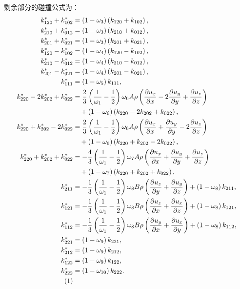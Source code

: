 剩余部分的碰撞公式为：
\begin{align*}
k_{120}^{*}+k_{102}^{*} & =\left(1-\omega_{3}\right)\left(k_{120}+k_{102}\right), \\
k_{210}^{*}+k_{012}^{*} & =\left(1-\omega_{3}\right)\left(k_{210}+k_{012}\right), \\
k_{201}^{*}+k_{021}^{*} & =\left(1-\omega_{3}\right)\left(k_{201}+k_{021}\right), \\
k_{120}^{*}-k_{102}^{*} & =\left(1-\omega_{4}\right)\left(k_{120}-k_{102}\right), \\
k_{210}^{*}-k_{012}^{*} & =\left(1-\omega_{4}\right)\left(k_{210}-k_{012}\right), \\
k_{201}^{*}-k_{021}^{*} & =\left(1-\omega_{4}\right)\left(k_{201}-k_{021}\right), \\
k_{111}^{*} & =\left(1-\omega_{5}\right) k_{111}, \\
k_{220}^{*}-2 k_{202}^{*}+k_{022}^{*} & =\frac{2}{3}\left(\frac{1}{\omega_{1}}-\frac{1}{2}\right) \omega_{6} A \rho\left(\frac{\partial u_x}{\partial x}-2 \frac{\partial u_y}{\partial y}+\frac{\partial u_z}{\partial z}\right) \\
&\quad +\left(1-\omega_{6}\right)\left(k_{220}-2 k_{202}+k_{022}\right), \\
k_{220}^{*}+k_{202}^{*}-2 k_{022}^{*} & =\frac{2}{3}\left(\frac{1}{\omega_{1}}-\frac{1}{2}\right) \omega_{6} A \rho\left(\frac{\partial u_x}{\partial x}+\frac{\partial u_y}{\partial y}-2 \frac{\partial u_z}{\partial z}\right) \\
&\quad +\left(1-\omega_{6}\right)\left(k_{220}+k_{202}-2 k_{022}\right), \\
k_{220}^{*}+k_{202}^{*}+k_{022}^{*} & =-\frac{4}{3}\left(\frac{1}{\omega_{1}}-\frac{1}{2}\right) \omega_{7} A \rho\left(\frac{\partial u_x}{\partial x}+\frac{\partial u_y}{\partial y}+\frac{\partial u_z}{\partial z}\right) \\
&\quad +\left(1-\omega_{7}\right)\left(k_{220}+k_{202}+k_{022}\right), \\
k_{211}^{*} & =-\frac{1}{3}\left(\frac{1}{\omega_{1}}-\frac{1}{2}\right) \omega_{8} B \rho\left(\frac{\partial u_z}{\partial y}+\frac{\partial u_y}{\partial z}\right)+\left(1-\omega_{8}\right) k_{211}, \\
k_{121}^{*} & =-\frac{1}{3}\left(\frac{1}{\omega_{1}}-\frac{1}{2}\right) \omega_{8} B \rho\left(\frac{\partial u_z}{\partial x}+\frac{\partial u_x}{\partial z}\right)+\left(1-\omega_{8}\right) k_{121}, \\
k_{112}^{*} & =-\frac{1}{3}\left(\frac{1}{\omega_{1}}-\frac{1}{2}\right) \omega_{8} B \rho\left(\frac{\partial u_y}{\partial x}+\frac{\partial u_x}{\partial y}\right)+\left(1-\omega_{8}\right) k_{112}, \\
k_{221}^{*} & =\left(1-\omega_{9}\right) k_{221}, \\
k_{212}^{*} & =\left(1-\omega_{9}\right) k_{212}, \\
k_{122}^{*} & =\left(1-\omega_{9}\right) k_{122}, \\
k_{222}^{*} & =\left(1-\omega_{10}\right) k_{222} . \\
\stepcounter{equation}\tag{\theequation}
\label{eq:cumulant_collision}
\end{align*}
